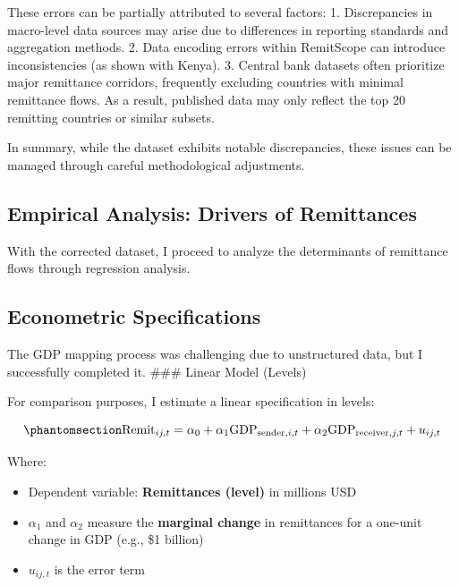 \documentclass[
  11pt,
]{article}
\providecommand{\tightlist}{%
  \setlength{\itemsep}{0pt}\setlength{\parskip}{0pt}}\usepackage{longtable,booktabs,array}
\begin{document}
These errors can be partially attributed to several factors: 1.
Discrepancies in macro-level data sources may arise due to differences
in reporting standards and aggregation methods. 2. Data encoding errors
within RemitScope can introduce inconsistencies (as shown with Kenya).
3. Central bank datasets often prioritize major remittance corridors,
frequently excluding countries with minimal remittance flows. As a
result, published data may only reflect the top 20 remitting countries
or similar subsets.

In summary, while the dataset exhibits notable discrepancies, these
issues can be managed through careful methodological adjustments.

\subsection{Empirical Analysis: Drivers of
Remittances}\label{empirical-analysis-drivers-of-remittances}

With the corrected dataset, I proceed to analyze the determinants of
remittance flows through regression analysis.

\subsection{Econometric
Specifications}\label{econometric-specifications}

The GDP mapping process was challenging due to unstructured data, but I
successfully completed it. \#\#\# Linear Model (Levels)

For comparison purposes, I estimate a linear specification in levels:

\begin{equation}\phantomsection\label{eq-linear}{
\text{Remit}_{ij,t} = \alpha_0 + \alpha_1 \text{GDP}_{\text{sender},i,t} + \alpha_2 \text{GDP}_{\text{receiver},j,t} + u_{ij,t}
}\end{equation}

Where:

\begin{itemize}
\tightlist
\item
  Dependent variable: \textbf{Remittances (level)} in millions USD
\item
  \(\alpha_1\) and \(\alpha_2\) measure the \textbf{marginal change} in
  remittances for a one-unit change in GDP (e.g., \$1 billion)
\item
  \(u_{ij,t}\) is the error term
\end{itemize}
\end{document}
